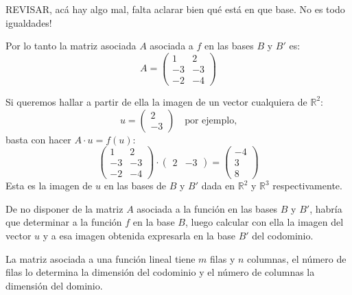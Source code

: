 \begin{tcolorbox}[mydanger]
  \centering
  REVISAR, acá hay algo mal, falta aclarar bien qué está en que base. No es todo igualdades!
\end{tcolorbox}

Por lo tanto la matriz asociada \(A\) asociada a \(f\) en las bases \(B\) y \(B'\) es:
\[
A = \begin{pmatrix}
  1 & 2 \\ -3 & -3 \\ -2 & -4
\end{pmatrix}
\] 

Si queremos hallar a partir de ella la imagen de un vector cualquiera de \(\mathbb{R}^2\):
\[
u = \begin{pmatrix}
  2 \\ -3
\end{pmatrix} \quad \text{por ejemplo,}
\]
basta con hacer \(A \cdot u = f(u)\):
\[
\begin{pmatrix}
  1 & 2 \\ -3 & -3 \\ -2 & -4
\end{pmatrix} \cdot \begin{pmatrix}
  2 & -3
\end{pmatrix} = \begin{pmatrix}
  -4 \\ 3 \\ 8
\end{pmatrix}
\]
Esta es la imagen de \(u\) en las bases de \(B\) y \(B'\) dada en \(\mathbb{R}^2\) y \(\mathbb{R}^3\) respectivamente.

De no disponer de la matriz \(A\) asociada a la función en las bases \(B\) y \(B'\), habría que determinar a la función \(f\) en la base \(B\), luego calcular con ella la imagen del vector \(u\) y a esa imagen obtenida expresarla en la base \(B'\) del codominio.

\begin{tcolorbox}
  La matriz asociada a una función lineal tiene \(m\) filas y \(n\) columnas, el número de filas lo determina la dimensión del codominio y el número de columnas la dimensión del dominio.
\end{tcolorbox}